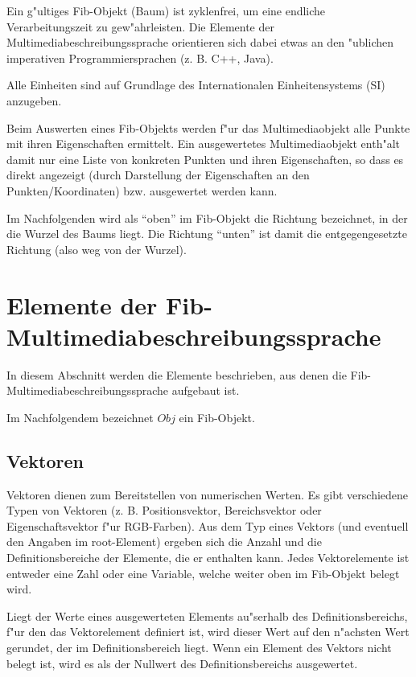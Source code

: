 Ein g"ultiges Fib-Objekt (Baum) ist zyklenfrei, um eine endliche Verarbeitungszeit zu gew"ahrleisten.
Die Elemente der Multimediabeschreibungssprache orientieren sich dabei etwas an den "ublichen imperativen Programmiersprachen (z. B. C++, Java).

Alle Einheiten sind auf Grundlage des Internationalen Einheitensystems (SI) anzugeben.

Beim Auswerten eines Fib-Objekts werden f"ur das Multimediaobjekt alle Punkte mit ihren Eigenschaften ermittelt. Ein ausgewertetes Multimediaobjekt enth"alt damit nur eine Liste von konkreten Punkten und ihren Eigenschaften, so dass es direkt angezeigt (durch Darstellung der Eigenschaften an den Punkten/Koordinaten) bzw. ausgewertet werden kann.

Im Nachfolgenden wird als ``oben'' im Fib-Objekt die Richtung bezeichnet, in der die Wurzel des Baums liegt. Die Richtung ``unten'' ist damit die entgegengesetzte Richtung (also weg von der Wurzel).


\section{Elemente der Fib-Multimediabeschreibungssprache}
\label{secFibElements}

In diesem Abschnitt werden die Elemente beschrieben, aus denen die Fib-Multi\-media\-beschrei\-bungs\-sprache aufgebaut ist.

Im Nachfolgendem bezeichnet $Obj$ ein Fib-Objekt.



\subsection{Vektoren}

Vektoren dienen zum Bereitstellen von numerischen Werten. Es gibt verschiedene Typen von Vektoren (z. B. Positionsvektor, Bereichsvektor oder Eigenschaftsvektor f"ur RGB-Farben). Aus dem Typ eines Vektors (und eventuell den Angaben im root-Element) ergeben sich die Anzahl und die Definitionsbereiche der Elemente, die er enthalten kann.
Jedes Vektorelemente ist entweder eine Zahl oder eine Variable, welche weiter oben im Fib-Objekt belegt wird.

Liegt der Werte eines ausgewerteten Elements au"serhalb des Definitionsbereichs, f"ur den das Vektorelement definiert ist, wird dieser Wert auf den n"achsten Wert gerundet, der im Definitionsbereich liegt.
Wenn ein Element des Vektors nicht belegt ist, wird es als der Nullwert des Definitionsbereichs ausgewertet.

